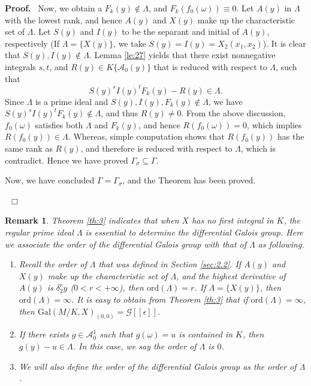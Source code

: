 \documentclass[preprint, 12pt]{elsarticle}
\newtheorem{rem}[thm]{Remark}
\numberwithin{equation}{section}
\newenvironment{proof}[1][Proof]{\textbf{#1.}\ }{\ $\Box$}
\newcommand{\A}{\mathcal{A}}
\newcommand{\G}{\mathcal{G}}
\newcommand{\Gal}{\mathrm{Gal}}
\begin{document}
\begin{proof}
Now, we obtain a $F_k(y)\not\in\Lambda$, and $F_k(f_0(\omega)) \equiv
0$. Let $A(y)$ in $\Lambda$ with the lowest rank, and hence $A(y)$
and $X(y)$ make up the characteristic set of $\Lambda$. Let $S(y)$
and $I(y)$ to be the separant and initial of $A(y)$, respectively (If
$\Lambda = \{X(y)\}$, we take $S(y) = I(y) = X_2(x_1,x_2)$). It is
clear that $S(y), I(y) \not\in \Lambda$. Lemma \ref{le:27} yields that
there exist nonnegative integrals $s,t$, and $R(y)\in
K\{\A_0(y)\}$ that is reduced with respect to $\Lambda$, such that
$$S(y)^s I(y)^t F_k(y) - R(y) \in \Lambda.$$
Since $\Lambda$ is a prime ideal and $S(y), I(y),
F_k(y)\not\in\Lambda$, we have $S(y)^sI(y)^tF_k(y)\not\in
\Lambda$, and thus $R(y)\not=0$. From the above discussion, 
$f_0(\omega)$ satisfies both $\Lambda$ and $F_k(y)$, and hence
$R(f_0(\omega)) = 0$, which implies $R(f_0(y))\in \Lambda$.
Whereas, simple computation shows that $R(f_0(y))$ has the same
rank as $R(y)$, and therefore is reduced with respect to $\Lambda$,
which is contradict. Hence we have proved $\Gamma_\sigma \subseteq
\Gamma$.

Now, we have concluded $\Gamma = \Gamma_\sigma$, and the Theorem has been proved.

\end{proof}

\begin{rem}
\label{rem:3} Theorem \ref{th:3} indicates that when $X$ has no first integral in $K$, the regular prime ideal $\Lambda$ is essential to determine the differential Galois group. Here we associate the order of the differential Galois group with that of $\Lambda$ as following.
\begin{enumerate}
\item Recall the order of $\Lambda$ that was defined in
Section \ref{sec:2.2}. If $A(y)$ and $X(y)$ make up the
characteristic set of $\Lambda$, and the highest derivative of
$A(y)$ is $\delta_2^ry$ ($0<r<+\infty$), then
$\mathrm{ord}(\Lambda) = r$. If $\Lambda = \{X(y)\}$, then
$\mathrm{ord}(\Lambda) = \infty$. It is easy to obtain from Theorem
\ref{th:3} that if $\mathrm{ord}(\Lambda) = \infty$, then
$\Gal(M/K,X)_{(0,0)} = \G[[\epsilon]]$. 
\item If there exists
$g\in \A_0^1$ such that $g(\omega)=u$ is contained in $K$, then $g(y)-
u\in\Lambda$. In this case, we say the order of $\Lambda$ is
$0$. 
\item We will also define the order of the differential
Galois group as the order of $\Lambda$.
\end{enumerate}
\end{rem}
\end{document}
